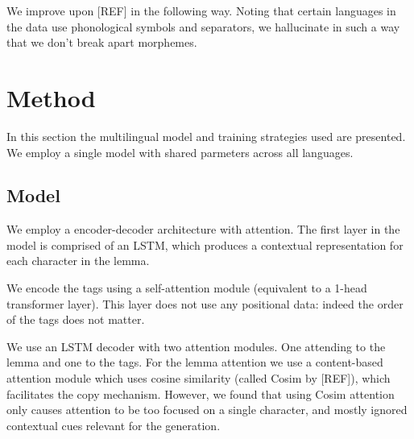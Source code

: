 \documentclass[11pt,a4paper]{article}
\begin{document}

We improve upon [REF] in the following way.
Noting that certain languages in the data use phonological symbols
and separators, we hallucinate in such a way that we don't break apart
morphemes.%


\section{Method}

In this section the multilingual model and training strategies used
are presented. We employ a single model with shared parmeters
across all languages. 

\subsection{Model}

We employ a encoder-decoder architecture with attention. The first
layer in the model is comprised of an LSTM, which produces a
contextual representation for each character in the lemma.

We encode the tags using a self-attention module (equivalent to a 1-head transformer layer).
This layer does not use any positional data: indeed the order of the tags does not matter.

We use an LSTM decoder with two attention modules. One attending to
the lemma and one to the tags. For the lemma attention we use a
content-based attention module which uses cosine similarity (called
Cosim by [REF]), which facilitates the copy mechanism.  However, we
found that using Cosim attention only causes attention to be too
focused on a single character, and mostly ignored contextual cues
relevant for the generation.
\end{document}
